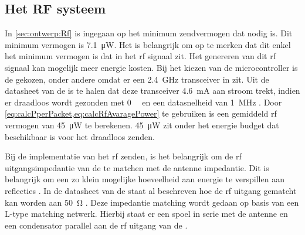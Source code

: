 \subsection{Het RF systeem}
In \cref{sec:ontwerp:Rf} is ingegaan op het minimum zendvermogen dat nodig is. Dit minimum vermogen is \qty{7.1}{\micro\watt}. Het is belangrijk om op te merken dat dit enkel het minimum vermogen is dat in het rf signaal zit. Het genereren van dit rf signaal kan mogelijk meer energie kosten. Bij het kiezen van de microcontroller is de \mcu gekozen, onder andere omdat er een \qty{2.4}{\giga\hertz} transceiver in zit. Uit de datasheet van de \mcu is te halen dat deze transceiver \qty{4.6}{\milli\ampere} aan stroom trekt, indien er draadloos wordt gezonden met \qty{0}{\deci\belmilliwatt} en een datasnelheid van \qty{1}{\mega\hertz} \cite{nrf52810}. Door \cref{eq:calcPperPacket,eq:calcRfAvaragePower} te gebruiken is een gemiddeld rf vermogen van \qty{45}{\micro\watt} te berekenen. \qty{45}{\micro\watt} zit onder het energie budget dat beschikbaar is voor het draadloos zenden.

Bij de implementatie van het rf zenden, is het belangrijk om de rf uitgangsimpedantie van de \mcu te matchen met de antenne impedantie. Dit is belangrijk om een zo klein mogelijke hoeveelheid aan energie te verspillen aan reflecties \cite{FundamentalsofAppliedElectromagnetics}. In de datasheet van de \mcu staat al beschreven hoe de rf uitgang gematcht kan worden aan \qty{50}{\ohm} \cite{nrf52810}. Deze impedantie matching wordt gedaan op basis van een L-type matching netwerk. Hierbij staat er een spoel in serie met de antenne en een condensator parallel aan de rf uitgang van de \mcu \cite{nrf52810}.